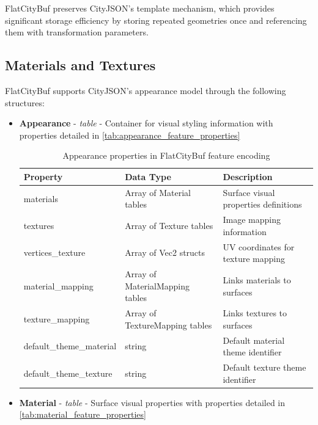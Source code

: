 FlatCityBuf preserves CityJSON's template mechanism, which provides significant storage efficiency by storing repeated geometries once and referencing them with transformation parameters.

\subsection{Materials and Textures}
\label{methodology:feature_encoding:materials_textures}

FlatCityBuf supports CityJSON's appearance model through the following structures:

\begin{itemize}
  \item \textbf{Appearance} - \textit{table} - Container for visual styling information with properties detailed in \autoref{tab:appearance_feature_properties}

    \begin{table}[h]
      \centering
      \caption{Appearance properties in FlatCityBuf feature encoding}
      \label{tab:appearance_feature_properties}
      \small
      \begin{tabularx}{\textwidth}{@{}llX@{}}
        \toprule
        \textbf{Property} & \textbf{Data Type} & \textbf{Description} \\
        \midrule
        materials & Array of Material tables & Surface visual properties definitions \\
        textures & Array of Texture tables & Image mapping information \\
        vertices\_texture & Array of Vec2 structs & UV coordinates for texture mapping \\
        material\_mapping & Array of MaterialMapping tables & Links materials to surfaces \\
        texture\_mapping & Array of TextureMapping tables & Links textures to surfaces \\
        default\_theme\_material & string & Default material theme identifier \\
        default\_theme\_texture & string & Default texture theme identifier \\
        \bottomrule
      \end{tabularx}
    \end{table}

  \item \textbf{Material} - \textit{table} - Surface visual properties with properties detailed in \autoref{tab:material_feature_properties}


\end{itemize}
